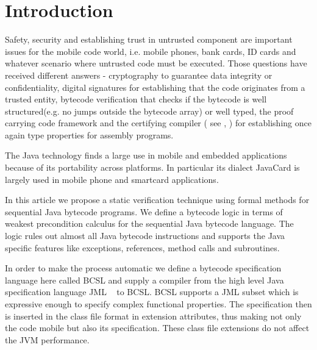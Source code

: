
\section{Introduction}\label{intro}
Safety, security and establishing trust in untrusted component are important issues for the mobile code world, 
i.e. mobile phones, bank cards, ID cards and whatever scenario where 
untrusted code must be executed. Those questions have received different answers - cryptography to guarantee data integrity or confidentiality,
 digital signatures for establishing that the code originates from a trusted entity, bytecode verification that checks if the bytecode 
 is well structured(e.g. no jumps outside the bytecode array) or well typed, 
 the proof carrying code framework  and the certifying compiler ( see  \cite{ComNec},\cite{DesNecLee98} ) for establishing once 
 again type properties for assembly programs.  



The Java technology finds a large use in mobile and embedded applications because of its portability across platforms. In particular its dialect JavaCard is largely used in mobile phone and smartcard applications. 

In this article we propose a static verification technique using formal methods for sequential Java bytecode programs.
We define a bytecode logic in terms of weakest precondition calculus for the sequential Java bytecode language. The logic rules out 
almost all Java bytecode instructions and supports the Java specific features like 
exceptions, references, method calls and subroutines.  
 
 In order to make the process automatic we define a bytecode specification language here called BCSL and supply a compiler from 
 the high level Java specification language JML ~\cite{JMLRefMan} to BCSL. 
 BCSL supports a JML subset which is expressive enough to specify complex functional properties. The specification then is 
 inserted in the class file format in extension attributes, thus making not only the code mobile but also its specification. These class
 file extensions do not affect the JVM performance.

